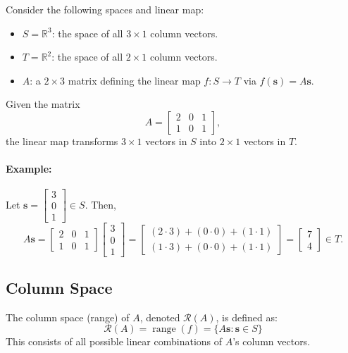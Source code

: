 \documentclass{article}
\begin{document}
Consider the following spaces and linear map:
\begin{itemize}
    \item \( S = \mathbb{R}^3 \): the space of all \( 3 \times 1 \) column vectors.
    \item \( T = \mathbb{R}^2 \): the space of all \( 2 \times 1 \) column vectors.
    \item \( A \): a \( 2 \times 3 \) matrix defining the linear map \( f: S \to T \) via \( f(\mathbf{s}) = A\mathbf{s} \).
\end{itemize}

Given the matrix 
\[
A = \begin{bmatrix}
    2 & 0 & 1 \\
    1 & 0 & 1
\end{bmatrix},
\]
the linear map transforms \( 3 \times 1 \) vectors in \( S \) into \( 2 \times 1 \) vectors in \( T \).

\paragraph*{Example:}
Let \( \mathbf{s} = \begin{bmatrix} 3 \\ 0 \\ 1 \end{bmatrix} \in S \). Then,
\[
A\mathbf{s} = \begin{bmatrix}
    2 & 0 & 1 \\
    1 & 0 & 1
\end{bmatrix}
\begin{bmatrix}
    3 \\
    0 \\
    1
\end{bmatrix}
= \begin{bmatrix}
    (2 \cdot 3) + (0 \cdot 0) + (1 \cdot 1) \\
    (1 \cdot 3) + (0 \cdot 0) + (1 \cdot 1)
\end{bmatrix}
= \begin{bmatrix}
    7 \\
    4
\end{bmatrix} \in T.
\]

\subsection{Column Space}
The column space (range) of \( A \), denoted \( \mathcal{R}(A) \), is defined as:
\[
\mathcal{R}(A) = \operatorname{range}(f) = \{ A\mathbf{s} : \mathbf{s} \in S \}
\]
This consists of all possible linear combinations of \( A \)'s column vectors.
\end{document}
